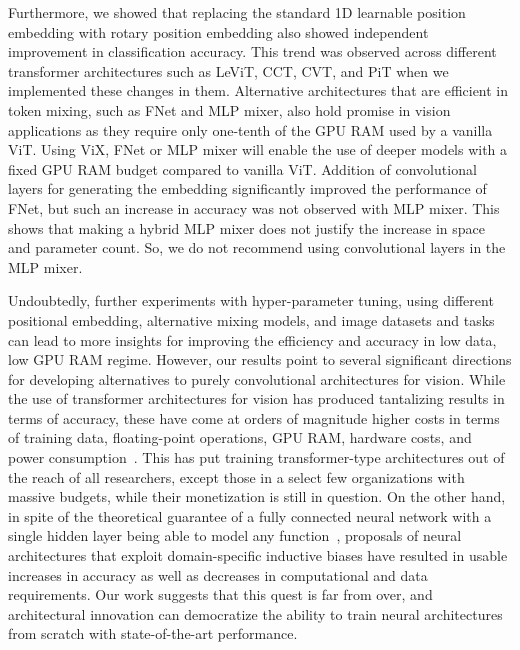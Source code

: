 \documentclass{article}
\begin{document}
Furthermore, we showed that replacing the standard 1D learnable position embedding with rotary position embedding also showed independent improvement in classification accuracy. This trend was observed across different transformer architectures such as LeViT, CCT, CVT, and PiT when we implemented these changes in them. Alternative architectures that are efficient in token mixing, such as FNet and MLP mixer, also hold promise in vision applications as they require only one-tenth of the GPU RAM used by a vanilla ViT. Using ViX, FNet or MLP mixer will enable the use of deeper models with a fixed GPU RAM budget compared to vanilla ViT. Addition of convolutional layers for generating the embedding significantly improved the performance of FNet, but such an increase in accuracy was not observed with MLP mixer. This shows that making a hybrid MLP mixer does not justify the increase in space and parameter count. So, we do not recommend using convolutional layers in the MLP mixer.

Undoubtedly, further experiments with hyper-parameter tuning, using different positional embedding, alternative mixing models, and image datasets and tasks can lead to more insights for improving the efficiency and accuracy in low data, low GPU RAM regime. However, our results point to several significant directions for developing alternatives to purely convolutional architectures for vision. While the use of transformer architectures for vision has produced tantalizing results in terms of accuracy, these have come at orders of magnitude higher costs in terms of training data, floating-point operations, GPU RAM, hardware costs, and power consumption~\cite{li2020train}. This has put training transformer-type architectures out of the reach of all researchers, except those in a select few organizations with massive budgets, while their monetization is still in question. On the other hand, in spite of the theoretical guarantee of a fully connected neural network with a single hidden layer being able to model any function~\cite{kolmogorov1957representation}, proposals of neural architectures that exploit domain-specific inductive biases have resulted in usable increases in accuracy as well as decreases in computational and data requirements. Our work suggests that this quest is far from over, and architectural innovation can democratize the ability to train neural architectures from scratch with state-of-the-art performance.



  
\end{document}
